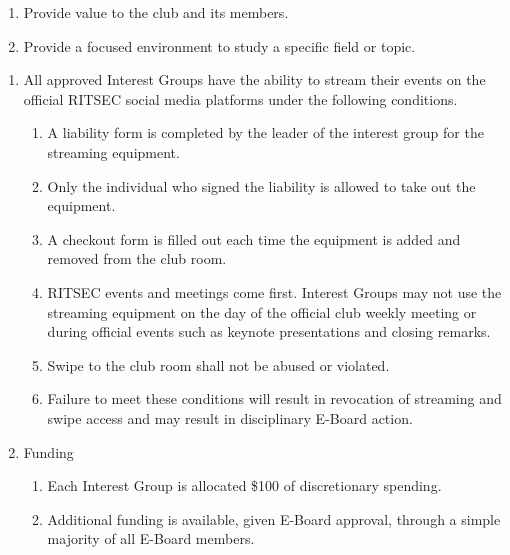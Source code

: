 

\begin{enumerate}
  \item Provide value to the club and its members.
  \item Provide a focused environment to study a specific field or topic.
\end{enumerate}


\begin{enumerate}
  \item All approved Interest Groups have the ability to stream their events on
    the official RITSEC social media platforms under the following conditions.
  \begin{enumerate}
    \item A liability form is completed by the leader of the interest group for
      the streaming equipment.
    \item Only the individual who signed the liability is allowed to take out
      the equipment.
    \item A checkout form is filled out each time the equipment is added and
      removed from the club room.
    \item RITSEC events and meetings come first. Interest Groups may not use
      the streaming equipment on the day of the official club weekly meeting or
      during official events such as keynote presentations and closing remarks.
    \item Swipe to the club room shall not be abused or violated.
    \item Failure to meet these conditions will result in revocation of
      streaming and swipe access and may result in disciplinary E-Board action.
  \end{enumerate}
  \item Funding
  \begin{enumerate}
    \item Each Interest Group is allocated \$100 of discretionary spending.
    \item Additional funding is available, given E-Board approval, through a
      simple majority of all E-Board members. 
  \end{enumerate}
\end{enumerate}

